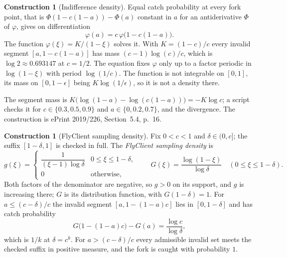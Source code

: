 \documentclass[11pt,a4paper]{article}
\theoremstyle{definition}
\newtheorem{construction}[theorem]{Construction}
\begin{document}
\begin{construction}[Indifference density]\label{def:indifference}
Equal catch probability at every fork point, that is
$\Phi(1-c(1-a))-\Phi(a)$ constant in $a$ for an antiderivative $\Phi$ of
$\varphi$, gives on differentiation
\[
  \varphi(a)=c\,\varphi\bigl(1-c(1-a)\bigr).
\]
The function $\varphi(\xi)=K/(1-\xi)$ solves it. With $K=(1-c)/c$ every
invalid segment $[a,1-c(1-a)]$ has mass $(c-1)\log(c)/c$, which is
$\log 2\approx 0.693147$ at $c=1/2$. The equation fixes $\varphi$ only up to
a factor periodic in $\log(1-\xi)$ with period $\log(1/c)$. The function is
not integrable on $[0,1]$, its mass on $[0,1-\epsilon]$ being
$K\log(1/\epsilon)$, so it is not a density there.
\end{construction}

The segment mass is
$K\bigl(\log(1-a)-\log(c(1-a))\bigr)=-K\log c$; a script checks it for
$c\in\{0.3,0.5,0.9\}$ and $a\in\{0,0.2,0.7\}$, and the divergence. The
construction is ePrint 2019/226, Section~5.4, p.~16.

\begin{construction}[FlyClient sampling density]\label{def:density}
Fix $0<c<1$ and $\delta\in(0,c]$; the suffix $[1-\delta,1]$ is checked in
full. The \emph{FlyClient sampling density} is
\[
  g(\xi)=\begin{cases}
    \dfrac{1}{(\xi-1)\log\delta} & 0\le\xi\le 1-\delta,\\[6pt]
    0 & \text{otherwise},
  \end{cases}
  \qquad
  G(\xi)=\frac{\log(1-\xi)}{\log\delta}\quad(0\le\xi\le 1-\delta).
\]
Both factors of the denominator are negative, so $g>0$ on its support, and
$g$ is increasing there; $G$ is its distribution function, with
$G(1-\delta)=1$. For $a\le(c-\delta)/c$ the invalid segment
$[a,1-(1-a)c]$ lies in $[0,1-\delta]$ and has catch probability
\[
  G\bigl(1-(1-a)c\bigr)-G(a)=\frac{\log c}{\log\delta},
\]
which is $1/k$ at $\delta=c^k$. For $a>(c-\delta)/c$ every admissible
invalid set meets the checked suffix in positive measure, and the fork is
caught with probability $1$.
\end{construction}
\end{document}
